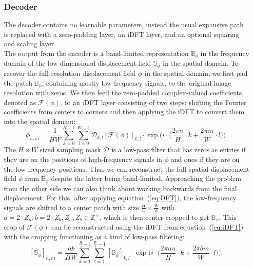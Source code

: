 \subsubsection{Decoder} \label{SubSubSec:Decoder}
The decoder contains no learnable parameters, instead the usual expansive path is replaced with a zero-padding layer, an iDFT layer, and an optional squaring and scaling layer. \\
The output from the encoder is a band-limited representation $\mathbb{B}_\phi$ in the frequency domain of the low dimensional displacement field $\mathbb{S}_\phi$ in the spatial domain. To recover the full-resolution displacement field $\phi$ in the spatial domain, we first pad the patch $\mathbb{B}_\phi$, containing mostly low frequency signals, to the original image resolution with zeros. We then feed the zero-padded complex-valued coefficients, denoted as $\mathcal{F}(\phi)$, to an iDFT layer consisting of two steps: shifting the Fourier coefficients from centers to corners and then applying the iDFT to convert them into the spatial domain:
\begin{equation} \label{eq:iDFT}
	\phi_{n,m} = \frac{1}{HW} \sum^{H-1}_{k=0} \sum^{W-1}_{l=0} \mathcal{D}_{k,l} [\mathcal{F}(\phi)]_{k,l} \cdot \exp \Bigg(i \cdot \bigg(\frac{2 \pi n}{H} \cdot k + \frac{2 \pi m}{W} \cdot l \bigg) \Bigg).
\end{equation}
The $H \times W$ sized sampling mask $\mathcal{D}$ is a low-pass filter that has zeros as entries if they are on the positions of high-frequency signals in $\phi$ and ones if they are on the low-frequency positions. Thus we can reconstruct the full spatial displacement field $\phi$ from $\mathbb{B}_\phi$ despite the latter being band-limited. Approaching the problem from the other side we can also think about working backwards from the final displacement. For this, after applying equation~(\ref{eq:DFT}), the low-frequency signals are shifted to a center patch with size $\frac{H}{a} \times \frac{W}{b}$ with $a = 2 \cdot Z_a, b = 2 \cdot Z_b, Z_a, Z_b \in \mathbb{Z}^+$, which is then center-cropped to get $\mathbb{B}_\phi$. This crop of $\mathcal{F}(\phi)$ can be reconstructed using the iDFT from equation~(\ref{eq:iDFT}) with the cropping functioning as a kind of low-pass filtering:
\begin{equation} \label{eq:decoder}
	[\mathbb{S}_\phi]_{n,m} = \frac{ab}{HW} \sum^{\frac{H}{a}-1}_{k=1} \sum^{\frac{W}{b}-1}_{l=1} [\mathbb{B}_\phi]_{k,l} \cdot \exp \Bigg(i \cdot \bigg(\frac{2 \pi a n}{H} \cdot k + \frac{2 \pi b m}{W} \cdot l \bigg) \Bigg),
\end{equation}
